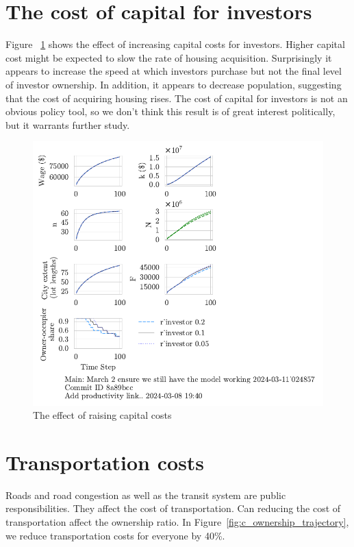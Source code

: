 \section{The cost of capital for investors}
Figure ~\ref{fig:capital_ownership_trajectory} shows the effect of increasing capital costs for investors. Higher capital cost might be expected to slow the rate of housing acquisition. Surprisingly it appears to increase the speed at which investors purchase but not the final level of investor ownership.  In addition, it appears to decrease population, suggesting that the cost of acquiring housing rises. The cost of capital for investors is not an obvious policy tool, so we don't think this result is of great interest politically, but it warrants further study.
\begin{figure}[h!t]
    \centering
    \includegraphics[scale=.8, trim={0 1.4cm 0 0},clip]{fig/r_investor-Main-024857.pdf}
    \caption{The effect of raising capital costs}
    \label{fig:capital_ownership_trajectory}
\end{figure}

\section{Transportation costs}
Roads and road congestion as well as the transit system are public responsibilities. They affect the cost of transportation. Can reducing the cost of transportation affect the ownership ratio. In Figure~\ref{fig:c_ownership_trajectory}, we reduce transportation costs for everyone by 40\%. 

